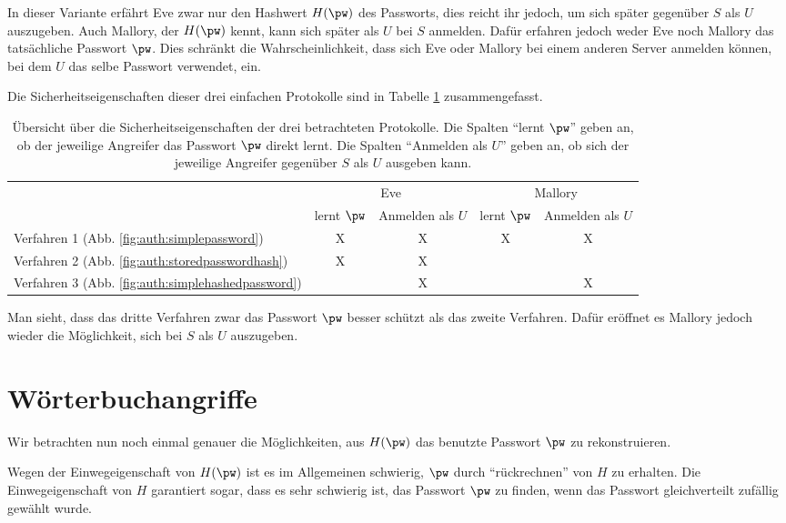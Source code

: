 In dieser Variante erfährt Eve zwar nur den Hashwert $H(\pw)$ des Passworts, dies reicht ihr jedoch, um sich später gegenüber $S$ als $U$ auszugeben. Auch Mallory, der $H(\pw)$ kennt, kann sich später als $U$ bei $S$ anmelden. Dafür erfahren jedoch weder Eve noch Mallory das tatsächliche Passwort $\pw$. Dies schränkt die Wahrscheinlichkeit, dass sich Eve oder Mallory bei einem anderen Server anmelden können, bei dem $U$ das selbe Passwort verwendet, ein.

Die Sicherheitseigenschaften dieser drei einfachen Protokolle sind in Tabelle \ref{table:auth:overview} zusammengefasst.\\
\begin{table}[h]
	\begin{center}
		\begin{tabular}{l||c|c|c|c}
			& \multicolumn{2}{c|}{Eve} & \multicolumn{2}{|c}{Mallory}\\
			& lernt $\pw$ & Anmelden als $U$ & lernt $\pw$ & Anmelden als $U$ \\\hline\hline
			Verfahren 1 (Abb. \ref{fig:auth:simplepassword}) & X & X & X & X \\\hline
			Verfahren 2 (Abb. \ref{fig:auth:storedpasswordhash}) & X & X & &  \\\hline
			Verfahren 3 (Abb. \ref{fig:auth:simplehashedpassword}) & & X &  & X \\
		\end{tabular}
	\end{center}
	\caption{Übersicht über die Sicherheitseigenschaften der drei betrachteten Protokolle. Die Spalten "`lernt $\pw$"' geben an, ob der jeweilige Angreifer das Passwort $\pw$ direkt lernt. Die Spalten "`Anmelden als $U$"' geben an, ob sich der jeweilige Angreifer gegenüber $S$ als $U$ ausgeben kann.}
	\label{table:auth:overview}
\end{table}

Man sieht, dass das dritte Verfahren zwar das Passwort $\pw$ besser schützt als das zweite Verfahren. Dafür eröffnet es Mallory jedoch wieder die Möglichkeit, sich bei $S$ als $U$ auszugeben.

\section{Wörterbuchangriffe}

Wir betrachten nun noch einmal genauer die Möglichkeiten, aus $H(\pw)$ das benutzte Passwort $\pw$ zu rekonstruieren.

Wegen der Einwegeigenschaft von $H(\pw)$ ist es im Allgemeinen schwierig, $\pw$ durch "`rückrechnen"' von $H$ zu erhalten. Die Einwegeigenschaft von $H$ garantiert sogar, dass es sehr schwierig ist, das Passwort $\pw$ zu finden, wenn das Passwort gleichverteilt zufällig gewählt wurde.

